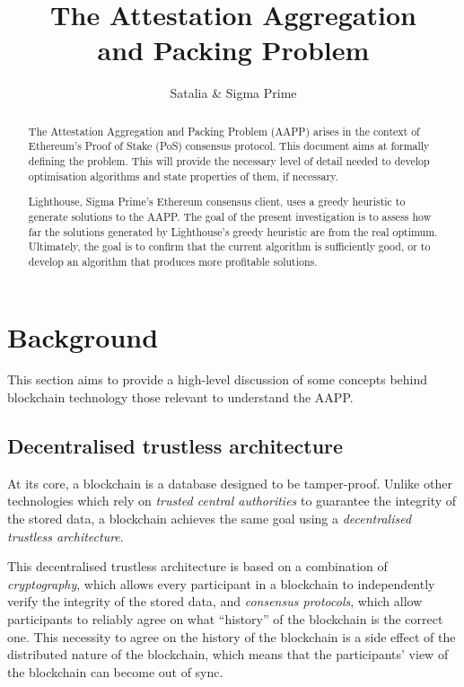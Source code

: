 \documentclass{article}
\title{The Attestation Aggregation\\and Packing Problem}
\author{Satalia \& Sigma Prime}
\begin{document}
\maketitle{}

\begin{abstract}
The Attestation Aggregation and Packing Problem (AAPP) arises in the context of
Ethereum's Proof of Stake (PoS) consensus protocol. This document aims at
formally defining the problem. This will provide the necessary level of detail
needed to develop optimisation algorithms and state properties of them, if
necessary.

Lighthouse, Sigma Prime's Ethereum consensus client, uses a greedy heuristic to
generate solutions to the AAPP. The goal of the present investigation is to
assess how far the solutions generated by Lighthouse's greedy heuristic are
from the real optimum. Ultimately, the goal is to confirm that the current
algorithm is sufficiently good, or to develop an algorithm that produces more
profitable solutions.
\end{abstract}

\tableofcontents

\section{Background}

This section aims to provide a high-level discussion of some concepts behind
blockchain technology those relevant to understand the AAPP.

\subsection{Decentralised trustless architecture}

At its core, a blockchain is a database designed to be tamper-proof. Unlike
other technologies which rely on \emph{trusted central authorities} to
guarantee the integrity of the stored data, a blockchain achieves the same goal
using a \emph{decentralised trustless architecture}. 

This decentralised trustless architecture is based on a combination of
\emph{cryptography}, which allows every participant in a blockchain to
independently verify the integrity of the stored data, and \emph{consensus
protocols}, which allow participants to reliably agree on what ``history'' of
the blockchain is the correct one. This necessity to agree on the history of
the blockchain is a side effect of the distributed nature of the blockchain,
which means that the participants' view of the blockchain can become out of
sync.
\end{document}
